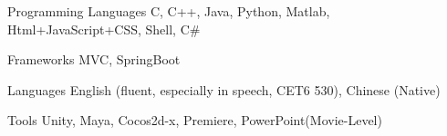 
\begin{cvskills}
  \cvskill
    {Programming Languages} %
    {C, C++, Java, Python, Matlab, Html+JavaScript+CSS, Shell, C\#} %

  \cvskill
    {Frameworks} %
    {MVC, SpringBoot} %

  \cvskill
    {Languages}
    {English (fluent, especially in speech, CET6 530), Chinese (Native)}
    
  \cvskill
    {Tools}
    {Unity, Maya, Cocos2d-x, Premiere, PowerPoint(Movie-Level)}
~\\
\end{cvskills}
